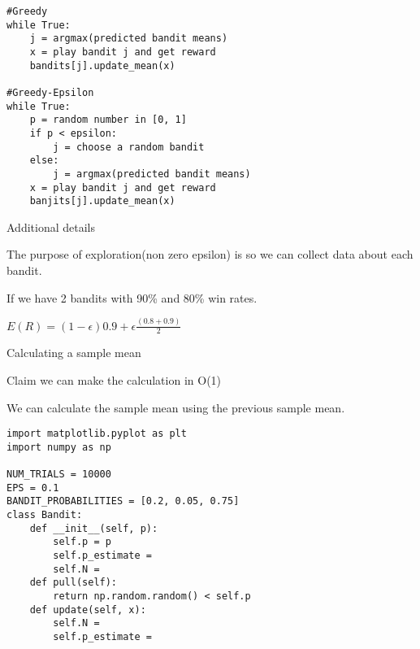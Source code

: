 \documentclass[30pt, a4]{article}
\begin{document}
\begin{lstlisting}
#Greedy
while True:
    j = argmax(predicted bandit means)
    x = play bandit j and get reward
    bandits[j].update_mean(x)

#Greedy-Epsilon
while True:
    p = random number in [0, 1]
    if p < epsilon:
        j = choose a random bandit
    else:
        j = argmax(predicted bandit means)
    x = play bandit j and get reward
    banjits[j].update_mean(x)
\end{lstlisting}

Additional details

The purpose of exploration(non zero epsilon) is so we can collect data about
each bandit.

If we have 2 bandits with 90\% and 80\% win rates.

$E(R) = (1-\epsilon)0.9+\epsilon \frac{(0.8+0.9)}{2}$

Calculating a sample mean

Claim we can make the calculation in O(1)

We can calculate the sample mean using the previous sample mean.

\begin{lstlisting}
import matplotlib.pyplot as plt
import numpy as np

NUM_TRIALS = 10000
EPS = 0.1
BANDIT_PROBABILITIES = [0.2, 0.05, 0.75]
class Bandit:
    def __init__(self, p):
        self.p = p
        self.p_estimate = 
        self.N = 
    def pull(self):
        return np.random.random() < self.p
    def update(self, x):
        self.N = 
        self.p_estimate = 
\end{lstlisting}
\end{document}
